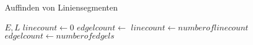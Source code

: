 \begin{algorithm}[ht]
\caption{Auffinden von Liniensegmenten}
\label{alg:findlinesegments}
\begin{algorithmic}[1]
	\Require $E, L$
	\State $linecount \gets 0$
	\State $edgelcount \gets$ 
	\State $linecount \gets numberoflinecount$
	\State $edgelcount \gets numberofedgels$
	\EndWhile
\end{algorithmic}
\end{algorithm}